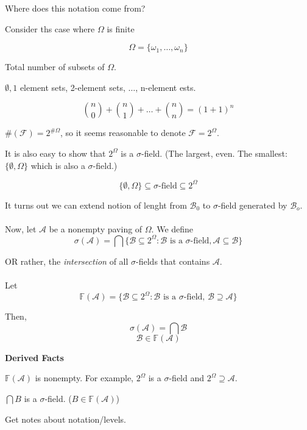 \documentclass[11pt,fleqn]{book} %
\begin{document}
\begin{remark}
	Where does this notation come from?

Consider ths case where $\Omega$ is finite

$$\Omega = \{\omega_1, \dots, \omega_n \} $$

Total number of subsets of $\Omega$. 

$\emptyset, 1$ element sets, 2-element sets, $\dots$, n-element ests.

$$ \binom{n}{0} + \binom{n}{1} + \dots + \binom{n}{n} = (1+1)^n$$

$\#(\mathcal{F})  = 2^{\# \Omega}$, so it seems reasonable to denote $\mathcal{F} = 2^\Omega$. 

It is also easy to show that $2^\Omega$ is a $\sigma$-field. (The largest, even. The smallest: $\{\emptyset, \Omega\}$ which is also a $\sigma$-field.)

$$\{\emptyset, \Omega\} \subseteq \sigma\text{-field} \subseteq 2^\Omega$$ 
\end{remark}

It turns out we can extend notion of lenght from $\mathcal{B}_0$ to $\sigma$-field generated by $\mathcal{B}_o$. \\
\\
Now, let $\mathcal{A}$ be a nonempty paving of $\Omega$. We define 
$$\sigma(\mathcal{A}) = \bigcap \{\mathcal{B} \subseteq 2^\Omega: \mathcal{B}\text{ is a }\sigma\text{-field}, \mathcal{A} \subseteq \mathcal{B}\} $$

OR rather, the \textit{intersection} of all $\sigma$-fields that contains $\mathcal{A}$. \\
\\
Let 
$$\mathbb{F}(\mathcal{A}) = \{\mathcal{B} \subseteq 2^\Omega: \mathcal{B} \text{ is a } \sigma\text{-field, } \mathcal{B} \supseteq \mathcal{A} \}$$

Then, 
$$\sigma(\mathcal{A}) = \bigcap \mathcal{B}$$
$$\mathcal{B} \in \mathbb{F}(\mathcal{A}) $$

\textbf{Derived Facts}

$\mathbb{F}(\mathcal{A})$ is nonempty. For example, $2^\Omega$ is a $\sigma$-field and $2^\Omega \supseteq \mathcal{A}$. 

$\bigcap  B$ is a $\sigma$-field. ($B \in \mathbb{F}(\mathcal{A})$)

\begin{remark}
	Get notes about notation/levels.
\end{remark}
\end{document}
